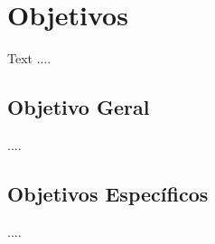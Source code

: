 \chapter{\nmu Objetivos}
\label{cha:objetivos}

Text ....

\section{Objetivo Geral}

....

\section{Objetivos Específicos}


....

